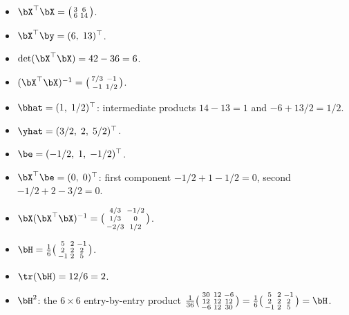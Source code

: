 \begin{itemize}[nosep]
  \item $\bX^\top\bX = \bigl(\begin{smallmatrix}3&6\\6&14\end{smallmatrix}\bigr)$. \checkmark
  \item $\bX^\top\by = (6,\;13)^\top$. \checkmark
  \item $\det(\bX^\top\bX) = 42-36 = 6$. \checkmark
  \item $(\bX^\top\bX)^{-1} = \bigl(\begin{smallmatrix}7/3&-1\\-1&1/2\end{smallmatrix}\bigr)$. \checkmark
  \item $\bhat = (1,\;1/2)^\top$: intermediate products $14-13=1$ and $-6+13/2 = 1/2$. \checkmark
  \item $\yhat = (3/2,\;2,\;5/2)^\top$. \checkmark
  \item $\be = (-1/2,\;1,\;-1/2)^\top$. \checkmark
  \item $\bX^\top\be = (0,\;0)^\top$: first component $-1/2+1-1/2=0$, second $-1/2+2-3/2=0$. \checkmark
  \item $\bX(\bX^\top\bX)^{-1} = \bigl(\begin{smallmatrix}4/3&-1/2\\1/3&0\\-2/3&1/2\end{smallmatrix}\bigr)$. \checkmark
  \item $\bH = \frac{1}{6}\bigl(\begin{smallmatrix}5&2&-1\\2&2&2\\-1&2&5\end{smallmatrix}\bigr)$. \checkmark
  \item $\tr(\bH) = 12/6 = 2$. \checkmark
  \item $\bH^2$: the $6\times 6$ entry-by-entry product
        $\frac{1}{36}\bigl(\begin{smallmatrix}30&12&-6\\12&12&12\\-6&12&30\end{smallmatrix}\bigr)
        = \frac{1}{6}\bigl(\begin{smallmatrix}5&2&-1\\2&2&2\\-1&2&5\end{smallmatrix}\bigr) = \bH$. \checkmark
\end{itemize}


